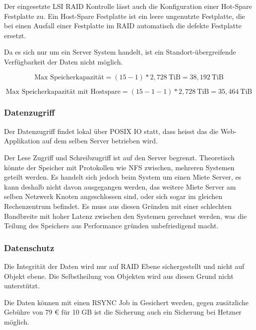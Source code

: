 Der eingesetzte LSI RAID Kontrolle lässt auch die Konfiguration einer Hot-Spare Festplatte zu. Ein Host-Spare Festplatte ist ein leere ungenutzte Festplatte, die bei einen Ausfall einer Festplatte im RAID automatisch die defekte Festplatte ersetzt. 

Da es sich nur um ein Server System handelt, ist ein Standort-übergreifende Verfügbarkeit der Daten nicht möglich.


\begin{equation}
\mbox{Max Speicherkapazität} = (15 -1)* 2,728 \mathrm{\ TiB}= 38,192 \mathrm{\ TiB}
\label{eqn:MaxSpeicherkapazitätHeztner}
\end{equation}

\begin{equation}
\mbox{Max Speicherkapazität mit Hostspare} = (15 -1-1)* 2,728 \mathrm{\ TiB}= 35,464 \mathrm{\ TiB}
\label{eqn:MaxSpeicherkapazitätHeztnerHotspare}
\end{equation}

\subsubsection{Datenzugriff}
Der Datenzugriff findet lokal über POSIX IO statt, dass heisst das die Web-Applikation auf dem selben Server betrieben wird. 

Der Lese Zugriff und Schreibzugriff ist auf den Server begrenzt. Theoretisch könnte der Speicher mit Protokollen wie NFS zwischen, mehreren Systemen geteilt werden. Es handelt sich jedoch beim System um einen Miete Server, es kann deshalb nicht davon ausgegangen werden, das weitere Miete Server am selben Netzwerk Knoten angeschlossen sind, oder sich sogar im gleichen Rechenzentrum befindet. Es muss aus diesen Gründen mit einer schlechten Bandbreite mit hoher Latenz zwischen den Systemen gerechnet werden, was die Teilung des Speichers aus Performance gründen unbefriedigend macht.

\subsubsection{Datenschutz}
Die Integrität der Daten wird nur auf RAID Ebene sichergestellt und nicht auf Objekt ebene. Die Selbstheilung von Objekten wird aus diesen Grund nicht unterstützt.

Die Daten können mit einen RSYNC Job in Gesichert werden, gegen zusätzliche Gebühre von 79 € für 10 GB ist die Sicherung auch ein Sicherung bei Hetzner möglich.

